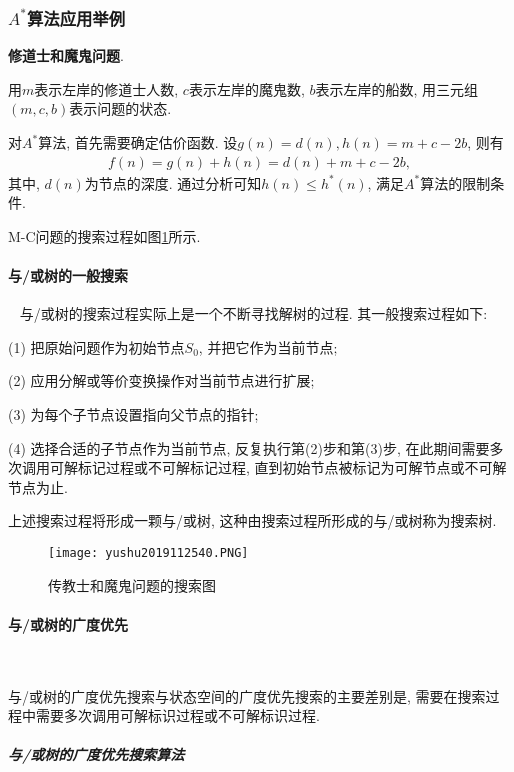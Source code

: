 \subsubsection{$A^*$算法应用举例}
\begin{example}
  \textbf{修道士和魔鬼问题}.
\end{example}
\begin{result}
用$m$表示左岸的修道士人数, $c$表示左岸的魔鬼数, $b$表示左岸的船数, 用三元组$(m, c, b)$表示问题的状态.

对$A^*$算法, 首先需要确定估价函数. 设$g(n)=d(n), h(n)=m+c-2b$, 则有
\begin{align}
  f(n)=g(n)+h(n)=d(n)+m+c-2b,
\end{align}
其中, $d(n)$为节点的深度. 通过分析可知$h(n)\leq h^*(n)$, 满足$A^*$算法的限制条件.
\end{result}

M-C问题的搜索过程如图\ref{AI32fig40}所示.

\paragraph{与/或树的一般搜索}~{}
与/或树的搜索过程实际上是一个不断寻找解树的过程. 其一般搜索过程如下:

(1) 把原始问题作为初始节点$S_0$, 并把它作为当前节点;

(2) 应用分解或等价变换操作对当前节点进行扩展;

(3) 为每个子节点设置指向父节点的指针;

(4) 选择合适的子节点作为当前节点, 反复执行第(2)步和第(3)步, 在此期间需要多次调用可解标记过程或不可解标记过程, 直到初始节点被标记为可解节点或不可解节点为止.

上述搜索过程将形成一颗与/或树, 这种由搜索过程所形成的与/或树称为搜索树.
\begin{figure}[H]
\centering
\texttt{[image: yushu2019112540.PNG]}
\caption{传教士和魔鬼问题的搜索图}
\label{AI32fig40}
\end{figure}
\paragraph{与/或树的广度优先}~{}

与/或树的广度优先搜索与状态空间的广度优先搜索的主要差别是, 需要在搜索过程中需要多次调用可解标识过程或不可解标识过程.
\subparagraph{与/或树的广度优先搜索算法}~{}

